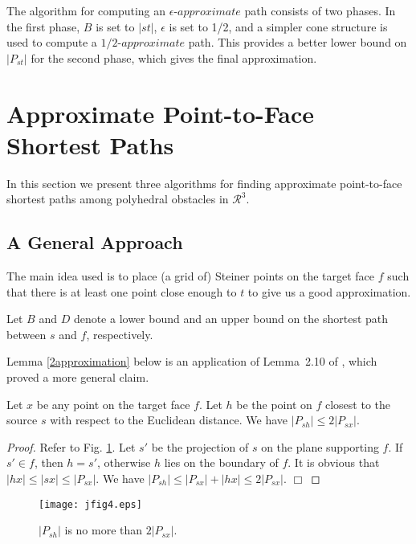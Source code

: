 \documentclass{llncs}
\begin{document}
The algorithm for computing an $\epsilon$-$approximate$ path consists of two phases.
In the first phase, $B$ is set to
$|st|$, $\epsilon$ is set to 1/2, and a simpler cone structure is used
to compute a $1/2$-$approximate$ path. This provides a better lower bound on $|P_{st}|$ for the second phase,
which gives the final approximation.


\section{Approximate Point-to-Face Shortest Paths}
In this section we
present three algorithms for finding approximate point-to-face shortest paths among polyhedral obstacles in $\mathcal{R}^3$.

\subsection{A General Approach}
The main idea used
is to place (a grid of) Steiner points on the target face $f$
such that there is at least one point close enough to $t$ to give us a good approximation.

Let $B$ and $D$ denote a lower bound and an upper bound on the shortest path between $s$ and $f$,
respectively.

Lemma \ref{2approximation} below is an application of Lemma~2.10 of \cite{Sar99}, which proved a more
general claim.
\begin{lemma}
\label{2approximation}
Let $x$ be any point on the target face $f$. Let $h$ be the point on $f$ closest to the source $s$
with respect to the Euclidean distance.
We have $|P_{sh}|\le 2 |P_{sx}|$.
\end{lemma}

\begin{proof}
Refer to Fig. \ref{jfig4}. Let $s'$ be the projection of $s$ on the plane supporting $f$.
If $s'\in f$, then $h=s'$, otherwise $h$ lies on the boundary of $f$.
It is obvious that $|hx|\le |sx|\le |P_{sx}|$. We have $|P_{sh}|\le |P_{sx}|+|hx| \le 2|P_{sx}|$.
\hfill $\Box$
\end{proof}

\begin{figure}\begin{center}
    \leavevmode
\texttt{[image: jfig4.eps]}
    \caption{$|P_{sh}|$ is no more than $2|P_{sx}|$.}
    \label{jfig4}
    \end{center}
\end{figure}
\end{document}
